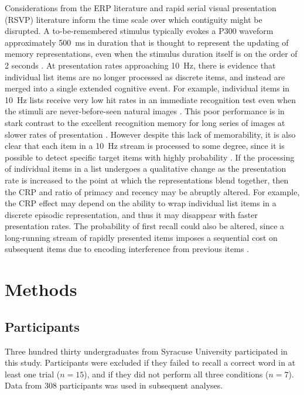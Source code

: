 \documentclass[10pt,letterpaper]{article}
\begin{document}
Considerations from the ERP literature and rapid serial visual presentation
(RSVP) literature inform the time scale over which contiguity might be
disrupted.  A to-be-remembered stimulus typically evokes a P300 waveform
approximately 500~ms in duration that is thought to represent the updating of
memory representations, even when the stimulus duration itself is on the order
of 2 seconds \cite{Donc81}.
At presentation rates approaching 10~Hz, there is evidence that individual list
items are no longer processed as discrete items, and instead are merged into a
single extended cognitive event.  For example, individual items in 10~Hz lists
receive very low hit rates in an immediate recognition test even when the
stimuli are never-before-seen natural images \cite{PottLevy69}.  This poor
performance is in stark contrast to the excellent recognition memory for long
series of images  at slower rates of presentation \cite{Stan73,BradEtal08}.
However despite this lack of memorability, it is also clear that each item in
a 10~Hz stream is processed to some degree, since
it is possible to detect specific target items with highly probability
\cite{Pott76}.  If the processing of individual items in a list undergoes a
qualitative change as the presentation rate is increased to the point at which
the representations blend together, then the CRP and ratio of primacy and
recency may be abruptly altered. For example, the CRP effect may depend
on the ability to wrap individual list items in a discrete episodic
representation, and thus it may disappear with faster presentation rates. The
probability of first recall could also be altered, since a long-running stream of
rapidly presented items imposes a sequential cost on subsequent items due to
encoding interference from previous items \cite{WyblEtal09}.  


\section{Methods}

\subsection{Participants}

Three hundred thirty undergraduates from Syracuse University participated in
this study.  
Participants were excluded if they failed to recall a correct word in at least
one trial ($n = 15$), and if they did not perform all three conditions ($n =
7$). Data from 308 participants was used in subsequent analyses.  
\end{document}
